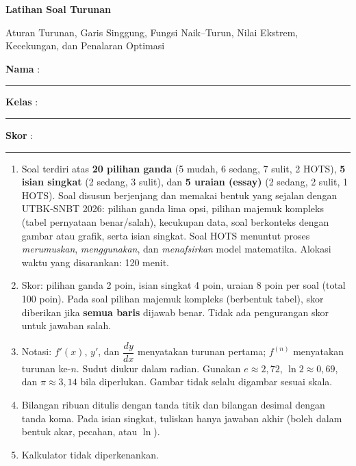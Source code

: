 \documentclass[a4paper,11pt]{article}
\newcommand{\dd}[2]{\dfrac{d#1}{d#2}}
\newcounter{no}
\begin{document}
\thispagestyle{fancy}

\begin{center}
  {\color{mainc}\fontsize{22}{26}\selectfont\bfseries Latihan Soal Turunan\par}
  \vspace{2pt}
  {\color{accc}\large Aturan Turunan, Garis Singgung, Fungsi Naik--Turun, Nilai Ekstrem, Kecekungan, dan Penalaran Optimasi\par}
\end{center}
\vspace{2pt}
\begin{tcolorbox}[colback=softbg,colframe=mainc!40,boxrule=0.6pt,arc=3pt,left=8pt,right=8pt,top=5pt,bottom=5pt]
\noindent\textbf{Nama} : \rule{4.6cm}{0.4pt}\hfill\textbf{Kelas} : \rule{2.2cm}{0.4pt}\hfill\textbf{Skor} : \rule{2.2cm}{0.4pt}
\end{tcolorbox}
\vspace{2pt}
\begin{tcolorbox}[colback=white,colframe=accc,boxrule=0.8pt,arc=3pt,left=8pt,right=8pt,top=4pt,bottom=4pt,title={\bfseries Petunjuk Pengerjaan},coltitle=white,fonttitle=\small]
\small
\begin{enumerate}[leftmargin=1.4em,itemsep=1pt,topsep=1pt]
\item Soal terdiri atas \textbf{20 pilihan ganda} (5 mudah, 6 sedang, 7 sulit, 2 HOTS), \textbf{5 isian singkat} (2 sedang, 3 sulit), dan \textbf{5 uraian (essay)} (2 sedang, 2 sulit, 1 HOTS). Soal disusun berjenjang dan memakai bentuk yang sejalan dengan UTBK-SNBT 2026: pilihan ganda lima opsi, pilihan majemuk kompleks (tabel pernyataan benar/salah), kecukupan data, soal berkonteks dengan gambar atau grafik, serta isian singkat. Soal HOTS menuntut proses \emph{merumuskan}, \emph{menggunakan}, dan \emph{menafsirkan} model matematika. Alokasi waktu yang disarankan: 120 menit.
\item Skor: pilihan ganda 2 poin, isian singkat 4 poin, uraian 8 poin per soal (total 100 poin). Pada soal pilihan majemuk kompleks (berbentuk tabel), skor diberikan jika \textbf{semua baris} dijawab benar. Tidak ada pengurangan skor untuk jawaban salah.
\item Notasi: $f'(x)$, $y'$, dan $\dd yx$ menyatakan turunan pertama; $f^{(n)}$ menyatakan turunan ke-$n$. Sudut diukur dalam radian. Gunakan $e\approx2{,}72$, $\ln2\approx0{,}69$, dan $\pi\approx3{,}14$ bila diperlukan. Gambar tidak selalu digambar sesuai skala.
\item Bilangan ribuan ditulis dengan tanda titik dan bilangan desimal dengan tanda koma. Pada isian singkat, tuliskan hanya jawaban akhir (boleh dalam bentuk akar, pecahan, atau $\ln$).
\item Kalkulator tidak diperkenankan.
\end{enumerate}
\end{tcolorbox}
\end{document}
